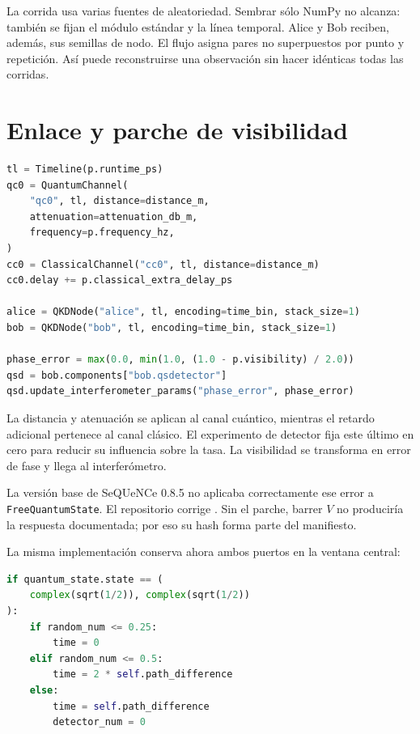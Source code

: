 La corrida usa varias fuentes de aleatoriedad. Sembrar sólo NumPy no alcanza: también se fijan el módulo estándar y la línea temporal. Alice y Bob reciben, además, sus semillas de nodo. El flujo asigna pares no superpuestos por punto y repetición. Así puede reconstruirse una observación sin hacer idénticas todas las corridas.

\section{Enlace y parche de visibilidad}

\begin{lstlisting}[language=Python, caption={Creación abreviada del enlace y configuración del receptor.}]
tl = Timeline(p.runtime_ps)
qc0 = QuantumChannel(
    "qc0", tl, distance=distance_m,
    attenuation=attenuation_db_m,
    frequency=p.frequency_hz,
)
cc0 = ClassicalChannel("cc0", tl, distance=distance_m)
cc0.delay += p.classical_extra_delay_ps

alice = QKDNode("alice", tl, encoding=time_bin, stack_size=1)
bob = QKDNode("bob", tl, encoding=time_bin, stack_size=1)

phase_error = max(0.0, min(1.0, (1.0 - p.visibility) / 2.0))
qsd = bob.components["bob.qsdetector"]
qsd.update_interferometer_params("phase_error", phase_error)
\end{lstlisting}

La distancia y atenuación se aplican al canal cuántico, mientras el retardo adicional pertenece al canal clásico. El experimento de detector fija este último en cero para reducir su influencia sobre la tasa. La visibilidad se transforma en error de fase y llega al interferómetro.

La versión base de SeQUeNCe 0.8.5 no aplicaba correctamente ese error a \texttt{FreeQuantumState}. El repositorio corrige . Sin el parche, barrer \(V\) no produciría la respuesta documentada; por eso su hash forma parte del manifiesto.

La misma implementación conserva ahora ambos puertos en la ventana central:

\begin{lstlisting}[language=Python, caption={Selección de puerto para estados X en el Mach--Zehnder.}]
if quantum_state.state == (
    complex(sqrt(1/2)), complex(sqrt(1/2))
):
    if random_num <= 0.25:
        time = 0
    elif random_num <= 0.5:
        time = 2 * self.path_difference
    else:
        time = self.path_difference
        detector_num = 0
\end{lstlisting}

